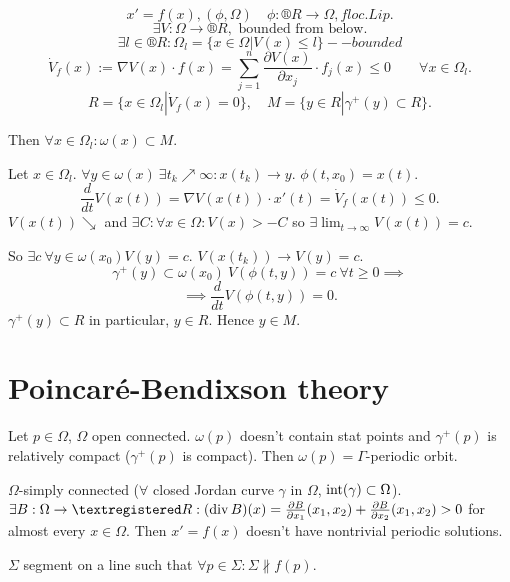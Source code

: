 \documentclass[12pt]{article}					%
\begin{document}
\begin{veta}
	$$ x' = f(x), (\phi, \Omega) \quad \phi: ®R \rightarrow \Omega, f loc. Lip. $$
	$$ \exists V: \Omega \rightarrow ®R, \text{ bounded from below}. $$
	$$ \exists l \in ®R: \Omega_l = \{x \in \Omega | V(x) ≤ l\} -- bounded $$
	$$ \dot{V}_f(x) := \nabla V(x) · f(x) = \sum_{j=1}^n  \frac{\partial V(x)}{\partial x_j}·f_j(x) ≤ 0 \qquad \forall x \in \Omega_l. $$
	$$ R = \{x \in \Omega_l | \dot{V}_f(x) = 0\}, \quad M = \{y \in R | \gamma^+(y) \subset R\}. $$

	Then $\forall x \in \Omega_l: \omega(x) \subset M$.

	\begin{dukazin}
		Let $x \in \Omega_l$. $\forall y \in \omega(x)\ \exists t_k \nearrow ∞: x(t_k) \rightarrow y$. $\phi(t, x_0) = x(t)$.
		$$ \frac{d}{dt} V(x(t)) = \nabla V(x(t))·x'(t) = \dot{V}_f(x(t)) ≤ 0. $$
		$V(x(t)) \searrow$ and $\exists C: \forall x \in \Omega: V(x) > -C$ so $\exists \lim_{t \rightarrow ∞} V(x(t)) = c$.

		So $\exists c\ \forall y \in \omega(x_0) V(y) = c$. $V(x(t_k)) \rightarrow V(y) = c$.
		$$ \gamma^+(y) \subset \omega(x_0)\ V(\phi(t, y)) = c\ \forall t ≥ 0 \implies $$
		$$ \implies \frac{d}{dt}V(\phi(t, y)) = 0. $$
		$\gamma^+(y) \subset R$ in particular, $y \in R$. Hence $y \in M$.
	\end{dukazin}
\end{veta}

\section{Poincaré-Bendixson theory}
\begin{veta}
	Let $p \in \Omega$, $\Omega$ open connected. $\omega(p)$ doesn't contain stat points and $\gamma^+(p)$ is relatively compact ($\gamma^+(p)$ is compact). Then $\omega(p) = \Gamma$-periodic orbit.
\end{veta}

\begin{veta}
	$\Omega$-simply connected ($\forall$ closed Jordan curve $\gamma$ in $\Omega$, $\operatorname{int}(\gamma) \subset \Omega$). $\exists B: \Omega \rightarrow ®R: (\Div B)(x) = \frac{\partial B}{\partial x_1}(x_1, x_2) + \frac{\partial B}{\partial x_2}(x_1, x_2) > 0$ for almost every $x \in \Omega$. Then $x' = f(x)$ doesn't have nontrivial periodic solutions.
\end{veta}

\begin{definice}[Transverzála]
	$\Sigma$ segment on a line such that $\forall p \in \Sigma: \Sigma \not\parallel f(p)$.
\end{definice}
\end{document}
